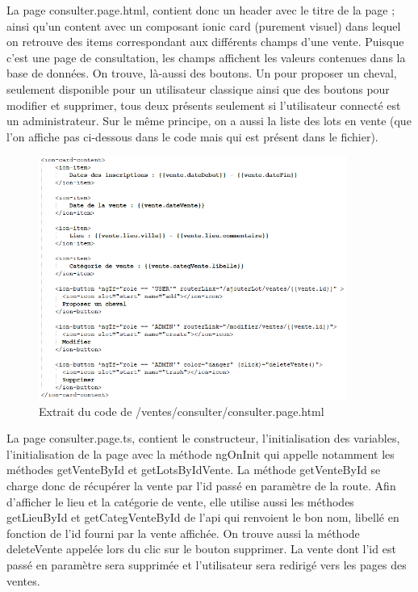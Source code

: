 			La page consulter.page.html, contient donc un header avec le titre de la page ; ainsi qu'un content avec un composant ionic card (purement visuel) dans lequel on retrouve des items correspondant aux différents champs d'une vente.\newline
			Puisque c'est une page de consultation, les champs affichent les valeurs contenues dans la base de données.\newline
			On trouve, là-aussi des boutons. Un pour proposer un cheval, seulement disponible pour un utilisateur classique ainsi que des boutons pour modifier et supprimer, tous deux présents seulement si l'utilisateur connecté est un administrateur. \newline
			Sur le même principe, on a aussi la liste des lots en vente (que l'on affiche pas ci-dessous dans le code mais qui est présent dans le fichier).

			\begin{figure}[H]
				\centering\includegraphics[width=0.9\textwidth, keepaspectratio]{res/consulter.png}
				\caption{Extrait du code de /ventes/consulter/consulter.page.html}
			\end{figure}

			La page consulter.page.ts, contient le constructeur, l'initialisation des variables, l'initialisation de la page avec la méthode ngOnInit qui appelle notamment les méthodes getVenteById et getLotsByIdVente.\newline
			La méthode getVenteById se charge donc de récupérer la vente par l'id passé en paramètre de la route. Afin d'afficher le lieu et la catégorie de vente, elle utilise aussi les méthodes getLieuById et getCategVenteById de l'api qui renvoient le bon nom, libellé en fonction de l'id fourni par la vente affichée.\newline
			On trouve aussi la méthode deleteVente appelée lors du clic sur le bouton supprimer. La vente dont l'id est passé en paramètre sera supprimée et l'utilisateur sera redirigé vers les pages des ventes.


